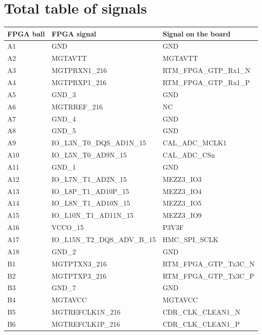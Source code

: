 \section{Total table of signals}

\begin{footnotesize}
	\begin{longtable}{|l|p{6cm}|p{6cm}|}
		\hline
FPGA ball	&	FPGA signal	&	Signal on the board	\\ \hline

A1	&	GND	&	GND	\\ \hline
A2	&	MGTAVTT	&	MGTAVTT	\\ \hline
A3	&	MGTPRXN1\_216	&	RTM\_FPGA\_GTP\_Rx1\_N	\\ \hline
A4	&	MGTPRXP1\_216	&	RTM\_FPGA\_GTP\_Rx1\_P	\\ \hline
A5	&	GND\_3	&	GND	\\ \hline
A6	&	MGTRREF\_216	&	NC	\\ \hline
A7	&	GND\_4	&	GND	\\ \hline
A8	&	GND\_5	&	GND	\\ \hline
A9	&	IO\_L3N\_T0\_DQS\_AD1N\_15	&	CAL\_ADC\_MCLK1	\\ \hline
A10	&	IO\_L5N\_T0\_AD9N\_15	&	CAL\_ADC\_CSn	\\ \hline
A11	&	GND\_1	&	GND	\\ \hline
A12	&	IO\_L7N\_T1\_AD2N\_15	&	MEZZ3\_IO3	\\ \hline
A13	&	IO\_L8P\_T1\_AD10P\_15	&	MEZZ3\_IO4	\\ \hline
A14	&	IO\_L8N\_T1\_AD10N\_15	&	MEZZ3\_IO5	\\ \hline
A15	&	IO\_L10N\_T1\_AD11N\_15	&	MEZZ3\_IO9	\\ \hline
A16	&	VCCO\_15	&	P3V3F	\\ \hline
A17	&	IO\_L15N\_T2\_DQS\_ADV\_B\_15	&	HMC\_SPI\_SCLK	\\ \hline
A18	&	GND\_2	&	GND	\\ \hline
B1	&	MGTPTXN3\_216	&	RTM\_FPGA\_GTP\_Tx3C\_N	\\ \hline
B2	&	MGTPTXP3\_216	&	RTM\_FPGA\_GTP\_Tx3C\_P	\\ \hline
B3	&	GND\_7	&	GND	\\ \hline
B4	&	MGTAVCC	&	MGTAVCC	\\ \hline
B5	&	MGTREFCLK1N\_216	&	CDR\_CLK\_CLEAN1\_N	\\ \hline
B6	&	MGTREFCLK1P\_216	&	CDR\_CLK\_CLEAN1\_P	\\ \hline

\end{longtable}
\end{footnotesize}
